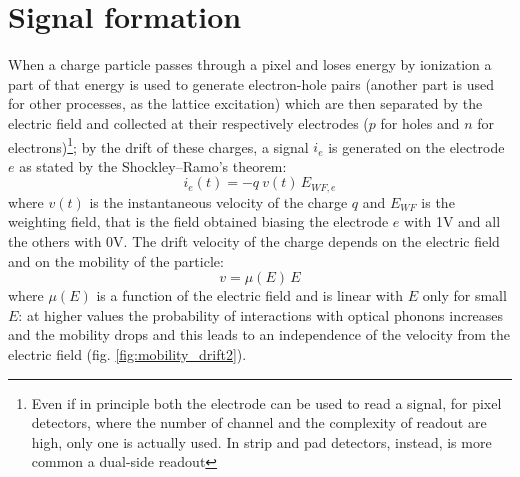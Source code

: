 \label{Appendix:pixels_overview}
\section{Signal formation}
    When a charge particle passes through a pixel and loses energy by ionization a part of that energy is used to generate electron-hole pairs (another part is used for other processes, as the lattice excitation) which are then separated by the electric field and collected at their respectively electrodes ($p$ for holes and $n$ for electrons)\footnote{Even if in principle both the electrode can be used to read a signal, for pixel detectors, where the number of channel and the complexity of readout are high, only one is actually used. In strip and pad detectors, instead, is more common a dual-side readout}; by the drift of these charges, a signal $i_e$ is generated on the  electrode $e$ as stated by the Shockley–Ramo's theorem: 
    \begin{equation}
        i_e(t) = -q\: v(t)\, E_{WF,e}
    \end{equation}
    where $v(t)$ is the instantaneous velocity of the charge $q$ and $E_{WF}$ is the weighting field, that is the field obtained biasing the electrode $e$ with 1V and all the others with 0V. The drift velocity of the charge depends on the electric field and on the mobility of the particle:
    \begin{equation}
        v = \mu(E)\, E
    \end{equation}
    where $\mu(E)$ is a function of the electric field and is linear with $E$ only for small $E$: at higher values the probability of interactions with optical phonons increases and the mobility drops and this leads to an independence of the velocity from the electric field (fig. \ref{fig:mobility_drift2}).
   
